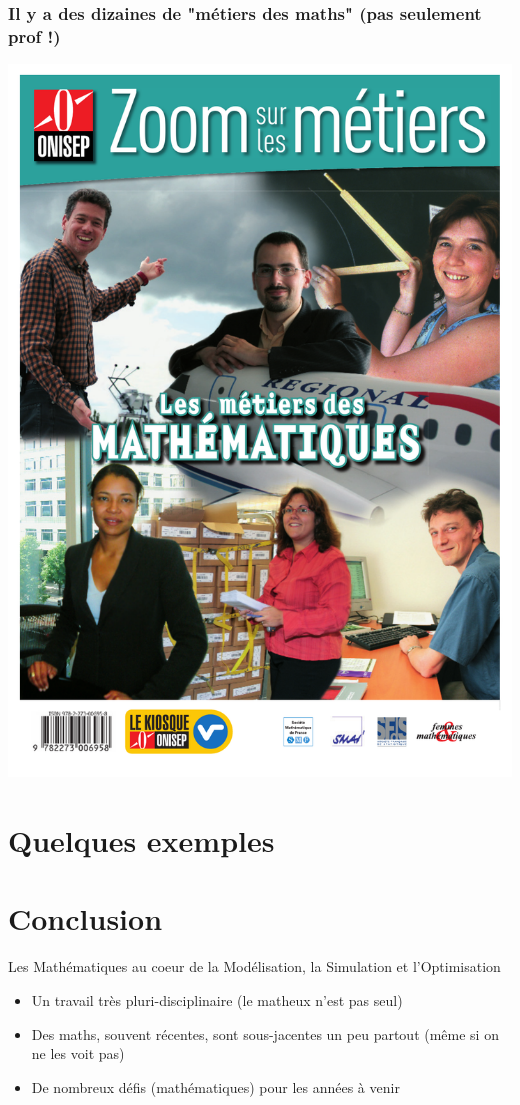 \documentclass[slideopt,A4]{beamer}
\begin{document}
%
\begin{frame}
\frametitle{Il y a des dizaines de "métiers des maths" {\small (pas seulement prof !) }}
%
\begin{center}
\includegraphics[width=0.4\linewidth]{onisep.pdf}
\end{center}
%
\centerline{}
%
\end{frame}

\section{Quelques exemples}
\label{sec:quelques-exemples}







\section{Conclusion}

\begin{frame}{Les Mathématiques au coeur de la Modélisation, la Simulation et l'Optimisation}
  
\begin{itemize}
\item Un travail très pluri-disciplinaire  (le matheux n'est pas seul)
\item Des maths, souvent récentes, sont sous-jacentes un peu partout (même si on ne les voit pas)
\item De nombreux défis (mathématiques) pour les années à venir %
\end{itemize}


\end{frame}
\end{document}
